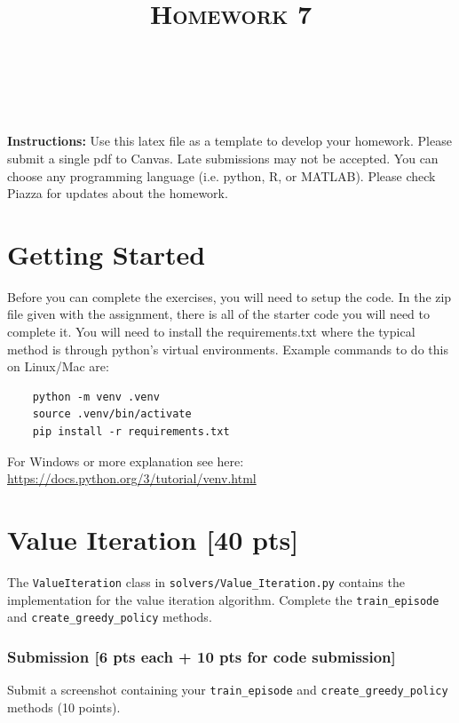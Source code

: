\documentclass[a4paper]{article}
\title{\textsc{Homework 7}} %
\author{
\red{$>>$Sriram Ashokkumar$<<$} \\
\red{$>>$908 216 3750$<<$}\\
}
\date{}
\theoremstyle{definition}
\begin{document}
\maketitle 

\textbf{Instructions:}
Use this latex file as a template to develop your homework. Please submit a single pdf to Canvas. Late submissions may not be accepted. You can choose any programming language (i.e. python, R, or MATLAB). Please check Piazza for updates about the homework.
\vspace{0.1in}

\section{Getting Started}
Before you can complete the exercises, you will need to setup the code.
%
In the zip file given with the assignment, there is all of the starter code you will need to complete it.
%
You will need to install the requirements.txt where the typical method is through python's virtual environments.
%
Example commands to do this on Linux/Mac are:
\begin{verbatim}
    python -m venv .venv
    source .venv/bin/activate
    pip install -r requirements.txt 
\end{verbatim}
%

For Windows or more explanation see here: \url{https://docs.python.org/3/tutorial/venv.html}

\section{Value Iteration [40 pts]}

The \verb|ValueIteration| class in \verb|solvers/Value_Iteration.py| contains the implementation for the value iteration algorithm. Complete the \verb|train_episode| and \verb|create_greedy_policy| methods.

\subsubsection*{Submission [6 pts each + 10 pts for code submission]}

Submit a screenshot containing your \verb|train_episode| and \verb|create_greedy_policy| methods (10 points).
\end{document}
